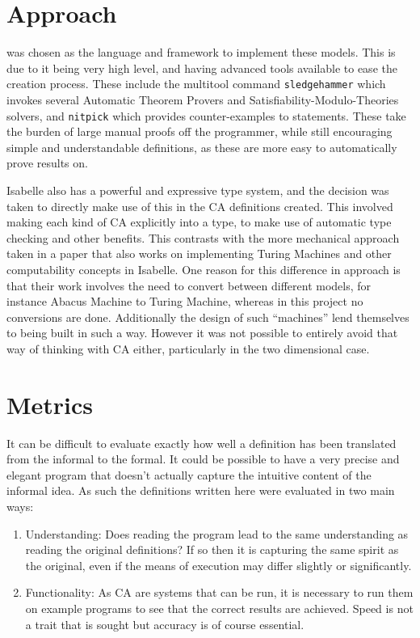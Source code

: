 \section{Approach}

 was chosen as the language and framework to implement these models.
This is due to it being very high level,
and having advanced tools available to ease the creation process.
These include the multitool command \texttt{sledgehammer} which invokes several Automatic Theorem Provers and Satisfiability-Modulo-Theories solvers, and \texttt{nitpick} which provides counter-examples to statements.
These take the burden of large manual proofs off the programmer,
while still encouraging simple and understandable definitions,
as these are more easy to automatically prove results on.

Isabelle also has a powerful and expressive type system,
and the decision was taken to directly make use of this in the CA definitions created.
This involved making each kind of CA explicitly into a type,
to make use of automatic type checking and other benefits.
This contrasts with the more mechanical approach taken in a paper \cite{urban} that also works on implementing Turing Machines and other computability concepts in Isabelle.
One reason for this difference in approach is that their work involves the need to convert between different models, for instance Abacus Machine to Turing Machine,
whereas in this project no conversions are done.
Additionally the design of such ``machines'' lend themselves to being built in such a way.
However it was not possible to entirely avoid that way of thinking with CA either, particularly in the two dimensional case.


\section{Metrics} \label{sec:metrics}

It can be difficult to evaluate exactly how well a definition has been translated from the informal to the formal.
It could be possible to have a very precise and elegant program that doesn't actually capture the intuitive content of the informal idea.
As such the definitions written here were evaluated in two main ways:

\begin{enumerate}
    \item Understanding: Does reading the program lead to the same understanding as reading the original definitions?
        If so then it is capturing the same spirit as the original,
        even if the means of execution may differ slightly or significantly.
    \item Functionality: As CA are systems that can be run,
        it is necessary to run them on example programs to see that the correct results are achieved.
        Speed is not a trait that is sought but accuracy is of course essential.
\end{enumerate}

